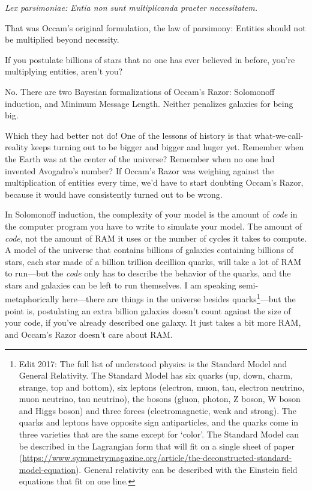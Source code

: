 {
 \textit{Lex parsimoniae: Entia non sunt multiplicanda praeter
necessitatem.}}

{
 That was Occam's original formulation, the law of
parsimony: Entities should not be multiplied beyond necessity.}

{
 If you postulate billions of stars that no one has ever believed
in before, you're multiplying entities,
aren't you?}

{
 No. There are two Bayesian formalizations of
Occam's Razor: Solomonoff induction, and Minimum
Message Length. Neither penalizes galaxies for being big.}

{
 Which they had better not do! One of the lessons of history is
that what-we-call-reality keeps turning out to be bigger and bigger and
huger yet. Remember when the Earth was at the center of the universe?
Remember when no one had invented Avogadro's number? If
Occam's Razor was weighing against the multiplication
of entities every time, we'd have to start doubting
Occam's Razor, because it would have consistently
turned out to be wrong.}

{
 In Solomonoff induction, the complexity of your model is the
amount of \textit{code} in the computer program you have to write to
simulate your model. The amount of \textit{code}, not the amount of RAM
it uses or the number of cycles it takes to compute. A model of the
universe that contains billions of galaxies containing billions of
stars, each star made of a billion trillion decillion quarks, will take
a lot of RAM to run---but the \textit{code} only has to describe the
behavior of the quarks, and the stars and galaxies can be left to run
themselves. I am speaking semi-metaphorically here---there are things
in the universe besides quarks\footnote{Edit 2017: The full list of understood physics is the Standard Model and General Relativity.  The Standard Model has six quarks (up, down, charm, strange, top and bottom), six leptons (electron, muon, tau, electron neutrino, muon neutrino, tau neutrino), the bosons (gluon, photon, Z boson, W boson and Higgs boson) and three forces (electromagnetic, weak and strong).  The quarks and leptons have opposite sign antiparticles, and the quarks come in three varieties that are the same except for `color'.  The Standard Model can be described in the Lagrangian form that will fit on a single sheet of paper (\url{https://www.symmetrymagazine.org/article/the-deconstructed-standard-model-equation}).  General relativity can be described with the Einstein field equations that fit on one line. }---but the point is, postulating an extra
billion galaxies doesn't count against the size of your
code, if you've already described one galaxy. It just
takes a bit more RAM, and Occam's Razor
doesn't care about RAM.}

